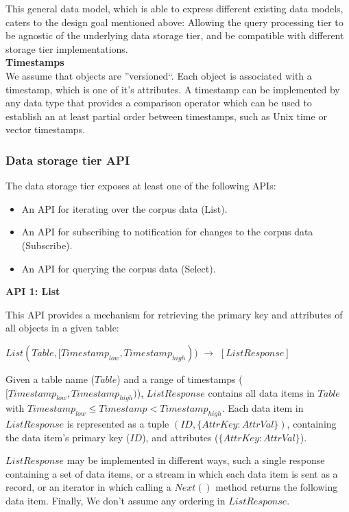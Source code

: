 This general data model, which is able to express different existing data models, caters to the design goal mentioned
above:
Allowing the query processing tier to be agnostic of the underlying data storage tier, and be compatible with different
storage tier implementations. \\

\noindent \textbf{Timestamps} \\
We assume that objects are ''versioned``.
Each object is associated with a timestamp, which is one of it's attributes.
A timestamp can be implemented by any data type that provides a comparison operator which can be used to establish an
at least partial order between timestamps, such as Unix time or vector timestamps.


\subsubsection{Data storage tier API}

The data storage tier exposes at least one of the following APIs:
\begin{itemize}
  \item An API for iterating over the corpus data (List).
  \item An API for subscribing to notification for changes to the corpus data (Subscribe).
  \item An API for querying the corpus data (Select).
\end{itemize}

\noindent
\textbf{API 1: List}

\noindent
This API provides a mechanism for retrieving the primary key and attributes of all objects in a given table:

$List(Table, [Timestamp_{low}, Timestamp_{high}))$ $\rightarrow$ $[ListResponse]$

\noindent
Given a table name ($Table$) and a range of timestamps ($[Timestamp_{low}, Timestamp_{high})$),
$ListResponse$ contains all data items in $Table$ with $Timestamp_{low} \leq Timestamp < Timestamp_{high}$.
Each data item in $ListResponse$ is represented as a tuple $(ID, \{AttrKey: AttrVal\})$, containing the data item's
primary key ($ID$), and attributes ($\{AttrKey: AttrVal\}$).

$ListResponse$ may be implemented in different ways, such a single response containing a set of
data items, or a stream in which each data item is sent as a record, or an iterator in which calling a $Next()$ method
returns the following data item.
Finally, We don't assume any ordering in $ListResponse$.

